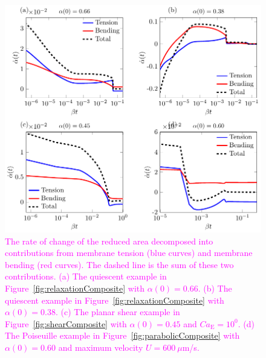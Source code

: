 \documentclass[prb,preprint,showpacs,preprintnumbers,amsmath,amssymb,longbibliography]{revtex4-1}
\newif\ifTikz
\begin{document}
\begin{figure}[htp]
  \ifTikz
  
  \else
  \includegraphics{figures/unconfinedRAdecomp.pdf}
  \fi
  \caption{\label{fig:unconfinedRAdecomp}\textcolor{magenta}{The rate of
  change of the reduced area decomposed into contributions from membrane tension (blue curves) and membrane bending (red curves).
  The dashed line is the sum of these two contributions. (a) The
  quiescent example in Figure~\ref{fig:relaxationComposite} with
  $\alpha(0) = 0.66$. (b) The quiescent example in
  Figure~\ref{fig:relaxationComposite} with $\alpha(0) = 0.38$. (c) The
  planar shear example in Figure~\ref{fig:shearComposite} with $\alpha(0) =
  0.45$ and $Ca_\mathrm{E} = 10^0$. (d) The Poiseuille example in
  Figure~\ref{fig:parabolicComposite} with $\alpha(0) = 0.60$ and
  maximum velocity $U = 600~\mu$m/s.}}
\end{figure}


\end{document}
